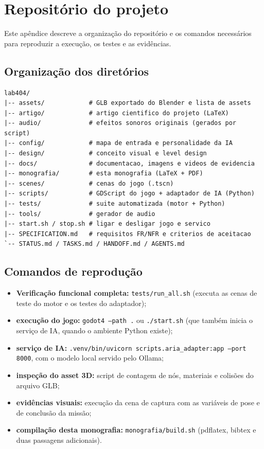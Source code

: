 \chapter{Repositório do projeto}
\label{ap:repositorio}

Este apêndice descreve a organização do repositório e os comandos necessários
para reproduzir a execução, os testes e as evidências.

\section*{Organização dos diretórios}
\label{ap:arvore}

\begin{verbatim}
lab404/
|-- assets/            # GLB exportado do Blender e lista de assets
|-- artigo/            # artigo cientifico do projeto (LaTeX)
|-- audio/             # efeitos sonoros originais (gerados por script)
|-- config/            # mapa de entrada e personalidade da IA
|-- design/            # conceito visual e level design
|-- docs/              # documentacao, imagens e videos de evidencia
|-- monografia/        # esta monografia (LaTeX + PDF)
|-- scenes/            # cenas do jogo (.tscn)
|-- scripts/           # GDScript do jogo + adaptador de IA (Python)
|-- tests/             # suite automatizada (motor + Python)
|-- tools/             # gerador de audio
|-- start.sh / stop.sh # ligar e desligar jogo e servico
|-- SPECIFICATION.md   # requisitos FR/NFR e criterios de aceitacao
`-- STATUS.md / TASKS.md / HANDOFF.md / AGENTS.md
\end{verbatim}

\section*{Comandos de reprodução}
\label{ap:comandos}

\begin{itemize}
  \item \textbf{Verificação funcional completa:} \texttt{tests/run\_all.sh}
  (executa as cenas de teste do motor e os testes do adaptador);
  \item \textbf{execução do jogo:} \texttt{godot4 --path .} ou
  \texttt{./start.sh} (que também inicia o serviço de IA, quando o ambiente
  Python existe);
  \item \textbf{serviço de IA:} \texttt{.venv/bin/uvicorn
  scripts.aria\_adapter:app --port 8000}, com o modelo local servido pelo
  Ollama;
  \item \textbf{inspeção do asset 3D:} script de contagem de nós, materiais e
  colisões do arquivo GLB;
  \item \textbf{evidências visuais:} execução da cena de captura com as
  variáveis de pose e de conclusão da missão;
  \item \textbf{compilação desta monografia:}
  \texttt{monografia/build.sh} (pdflatex, bibtex e duas passagens
  adicionais).
\end{itemize}

